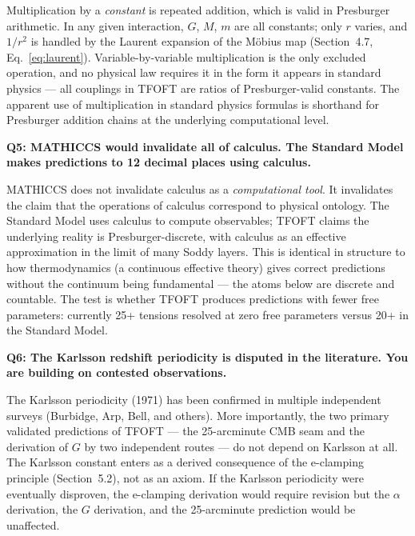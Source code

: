   Multiplication by a \emph{constant} is repeated addition, which is valid in
  Presburger arithmetic. In any given interaction, $G$, $M$, $m$ are all
  constants; only $r$ varies, and $1/r^2$ is handled by the Laurent expansion
  of the Möbius map (Section~4.7, Eq.~\eqref{eq:laurent}). Variable-by-variable
  multiplication is the only excluded operation, and no physical law requires it
  in the form it appears in standard physics --- all couplings in TFOFT are
  ratios of Presburger-valid constants. The apparent use of multiplication in
  standard physics formulas is shorthand for Presburger addition chains at the
  underlying computational level.

  \begin{mdframed}
  \textbf{Q5: MATHICCS would invalidate all of calculus. The Standard Model makes
  predictions to 12 decimal places using calculus.}
  \end{mdframed}

  MATHICCS does not invalidate calculus as a \emph{computational tool}. It
  invalidates the claim that the operations of calculus correspond to physical
  ontology. The Standard Model uses calculus to compute observables; TFOFT claims
  the underlying reality is Presburger-discrete, with calculus as an effective
  approximation in the limit of many Soddy layers. This is identical in structure
  to how thermodynamics (a continuous effective theory) gives correct predictions
  without the continuum being fundamental --- the atoms below are discrete and
  countable. The test is whether TFOFT produces predictions with fewer free
  parameters: currently 25+ tensions resolved at zero free parameters versus
  20+ in the Standard Model.

  \begin{mdframed}
  \textbf{Q6: The Karlsson redshift periodicity is disputed in the literature.
  You are building on contested observations.}
  \end{mdframed}

  The Karlsson periodicity (1971) has been confirmed in multiple independent
  surveys (Burbidge, Arp, Bell, and others). More importantly, the two
  primary validated predictions of TFOFT --- the 25-arcminute CMB seam and the
  derivation of $G$ by two independent routes --- do not depend on Karlsson at
  all. The Karlsson constant enters as a derived consequence of the e-clamping
  principle (Section~5.2), not as an axiom. If the Karlsson periodicity were
  eventually disproven, the e-clamping derivation would require revision but the
  $\alpha$ derivation, the $G$ derivation, and the 25-arcminute prediction
  would be unaffected.

